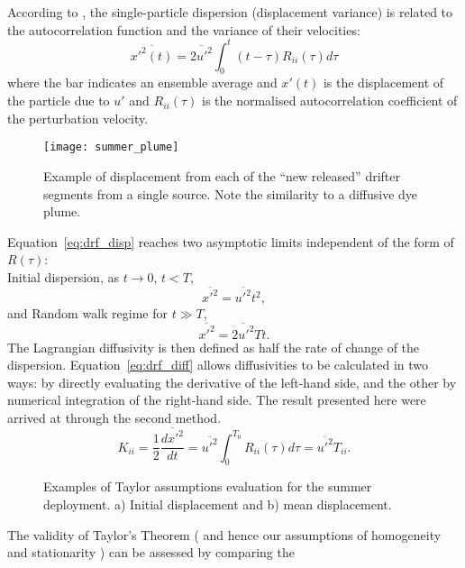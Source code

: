 According to \citep{Taylor21}, the single-particle dispersion
(displacement variance) is related to the autocorrelation function
and the variance of their velocities:
\begin{equation}\label{eq:drf_disp}
   \overline{x'^{2}(t)} = \overline{2u'^{2}}\int^t_0(t-\tau)R_{ii}(\tau)d\tau
\end{equation}
where the bar indicates an ensemble average and $x'(t)$ is the
displacement of the particle due to $u'$ and $R_{ii}(\tau)$ is the
normalised autocorrelation coefficient of the perturbation
velocity.
\begin{figure}
\centering %
\texttt{[image: summer\_plume]}%
\caption{Example of displacement from each of the ``new released''
drifter segments from a single source. Note the similarity to a
diffusive dye plume.}
\label{fig:drf_dye}%
\end{figure}
Equation~\ref{eq:drf_disp} reaches two
asymptotic limits independent of the form of $R(\tau)$:\\
Initial dispersion, as $t\rightarrow 0$, $t<T$,
\begin{equation}\label{eq:drf_inidisp}
    \overline{x'^2}=\overline{u'^2}t^2,
\end{equation}
and Random walk regime for $t\gg T$,
\begin{equation}\label{eq:drf_randw}
    \overline{x'^2}=\overline{2u'^2}Tt.
\end{equation}
The Lagrangian diffusivity is then defined as half the rate of
change of the dispersion. Equation~\ref{eq:drf_diff} allows
diffusivities to be calculated in two ways: by directly evaluating
the derivative of the left-hand side, and the other by numerical
integration of the right-hand side. The result presented here were
arrived at through the second method.
\begin{equation}\label{eq:drf_diff}
    K_{ii} = \frac{1}{2} \frac{\overline{dx'^2}}{dt}=\overline{u'^2}
    \int^{T_0}_0 R_{ii}(\tau) d\tau = \overline{u'^2}T_{ii}.
\end{equation}
\begin{figure}
\centering %
\caption{Examples of Taylor assumptions evaluation for the summer
deployment. a) Initial displacement and b) mean displacement.}
\label{fig:drf_dispcomp}%
\end{figure}
The validity of Taylor's Theorem ( and hence our assumptions of
homogeneity and stationarity ) can be assessed by comparing the
